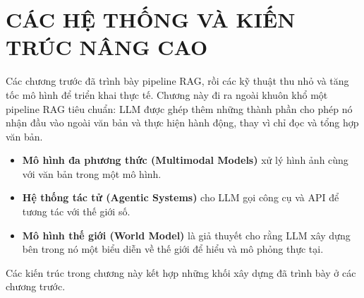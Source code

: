\chapter{CÁC HỆ THỐNG VÀ KIẾN TRÚC NÂNG CAO}
\label{chap:advanced_systems}

Các chương trước đã trình bày pipeline RAG, rồi các kỹ thuật thu nhỏ và tăng tốc mô hình để triển khai thực tế. Chương này đi ra ngoài khuôn khổ một pipeline RAG tiêu chuẩn: LLM được ghép thêm những thành phần cho phép nó nhận đầu vào ngoài văn bản và thực hiện hành động, thay vì chỉ đọc và tổng hợp văn bản.

\begin{itemize}
	\item \textbf{Mô hình đa phương thức (Multimodal Models)} xử lý hình ảnh cùng với văn bản trong một mô hình.
	\item \textbf{Hệ thống tác tử (Agentic Systems)} cho LLM gọi công cụ và API để tương tác với thế giới số.
	\item \textbf{Mô hình thế giới (World Model)} là giả thuyết cho rằng LLM xây dựng bên trong nó một biểu diễn về thế giới để hiểu và mô phỏng thực tại.
\end{itemize}

Các kiến trúc trong chương này kết hợp những khối xây dựng đã trình bày ở các chương trước.